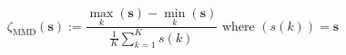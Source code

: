 \begin{equation}
	\zeta_\text{MMD}(\textbf{s}) := \frac{\max_k\left(\textbf{s}\right) - \min_k\left(\textbf{s}\right)}{\frac{1}{K}\sum_{k=1}^{K}s(k)}
	\text{ where } (s(k)) = \textbf{s}
\label{ch1:equ:min-max-difference-definition}
\end{equation}